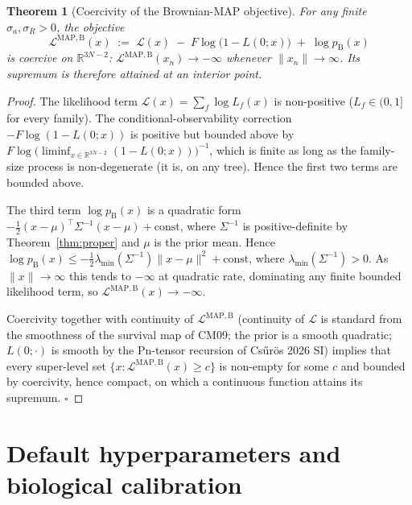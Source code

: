 \documentclass[11pt]{article}
\newcommand{\R}{\mathbb{R}}
\newcommand{\troot}{R}
\newcommand{\Ll}{\mathcal{L}}          %
\newtheorem{theorem}{Theorem}
\theoremstyle{definition}
\begin{document}
\begin{theorem}[Coercivity of the Brownian-MAP objective]
\label{thm:coercive}
For any finite $\sigma_a, \sigma_\troot > 0$, the objective
\begin{equation}
\Ll^{\mathrm{MAP, B}}(x)
\;:=\;
\Ll(x) \;-\; F\log\bigl(1 - L(0;x)\bigr) \;+\; \log p_{\mathrm{B}}(x)
\label{eq:map-obj}
\end{equation}
is coercive on $\R^{3N-2}$: $\Ll^{\mathrm{MAP, B}}(x_n) \to -\infty$
whenever $\|x_n\| \to \infty$. Its supremum is therefore attained at
an interior point.
\end{theorem}
\begin{proof}
The likelihood term $\Ll(x) = \sum_f \log L_f(x)$ is non-positive
($L_f \in (0,1]$ for every family). The conditional-observability
correction $-F\log(1-L(0;x))$ is positive but bounded above by
$F\log\bigl(\liminf_{x\in\R^{3N-2}}(1 - L(0;x))\bigr)^{-1}$, which is
finite as long as the family-size process is non-degenerate (it is,
on any tree). Hence the first two terms are bounded above.

The third term $\log p_{\mathrm{B}}(x)$ is a quadratic form
$-\tfrac{1}{2}(x-\mu)^\top \Sigma^{-1}(x-\mu) + \mathrm{const}$, where
$\Sigma^{-1}$ is positive-definite by Theorem~\ref{thm:proper} and
$\mu$ is the prior mean. Hence
$\log p_{\mathrm{B}}(x) \le -\tfrac{1}{2}\lambda_{\min}(\Sigma^{-1})
\|x - \mu\|^2 + \mathrm{const}$,
where $\lambda_{\min}(\Sigma^{-1}) > 0$.  As $\|x\|\to\infty$ this
tends to $-\infty$ at quadratic rate, dominating any finite bounded
likelihood term, so $\Ll^{\mathrm{MAP, B}}(x) \to -\infty$.

Coercivity together with continuity of $\Ll^{\mathrm{MAP,B}}$
(continuity of $\Ll$ is standard from the smoothness of the survival
map of CM09; the prior is a smooth quadratic; $L(0;\cdot)$ is smooth
by the Pn-tensor recursion of Cs\H{u}r\"os 2026 SI) implies that
every super-level set $\{x : \Ll^{\mathrm{MAP, B}}(x) \ge c\}$ is
non-empty for some $c$ and bounded by coercivity, hence compact, on
which a continuous function attains its supremum. $\square$
\end{proof}

\section{Default hyperparameters and biological calibration}
\end{document}
